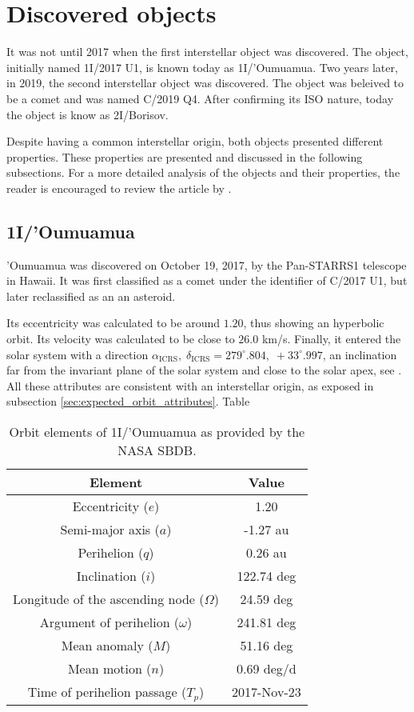 \section{Discovered objects}

It was not until 2017 when the first interstellar object was discovered. The
object, initially named 1I/2017 U1, is known today as 1I/'Oumuamua. Two years
later, in 2019, the second interstellar object was discovered. The object was
beleived to be a comet and was named C/2019 Q4. After confirming its ISO nature,
today the object is know as 2I/Borisov. 

Despite having a common interstellar origin, both objects presented different
properties. These properties are presented and discussed in the following
subsections. For a more detailed analysis of the objects and their properties,
the reader is encouraged to review the article by \cite{jewitt2023}.

\subsection{1I/'Oumuamua}

'Oumuamua was discovered on October 19, 2017, by the Pan-STARRS1 telescope in
Hawaii. It was first classified as a comet under the identifier of C/2017 U1,
but later reclassified as an an asteroid.

Its eccentricity was calculated to be around $1.20$, thus showing an hyperbolic
orbit. Its velocity was calculated to be close to $26.0$ km/s. Finally, it
entered the solar system with a direction $\alpha_{\text{ICRS}},\;
\delta_{\text{ICRS}} = 279^\circ.804,\; +33^\circ.997$, an inclination far from
the invariant plane of the solar system and close to the solar apex, see
\cite{mamajek2017}. All these attributes are consistent with an interstellar
origin, as exposed in subsection \ref{sec:expected_orbit_attributes}. Table 

\begin{table}[H]
  \centering
  \begin{tabular}{|c|c|}
    \hline
    Element & Value \\
    \hline
    Eccentricity ($e$) & 1.20 \\
    Semi-major axis ($a$) & -1.27 au \\
    Perihelion ($q$) & 0.26 au \\
    Inclination ($i$) & 122.74 deg \\
    Longitude of the ascending node ($\Omega$) & 24.59 deg \\
    Argument of perihelion ($\omega$) & 241.81 deg \\
    Mean anomaly ($M$) & 51.16 deg \\
    Mean motion ($n$) & 0.69 deg/d \\
    Time of perihelion passage ($T_p$) & 2017-Nov-23 \\
    \hline
  \end{tabular}
  \caption{Orbit elements of 1I/'Oumuamua as provided by the NASA SBDB.}
  \label{tab:oumuamua_elements}
\end{table}

